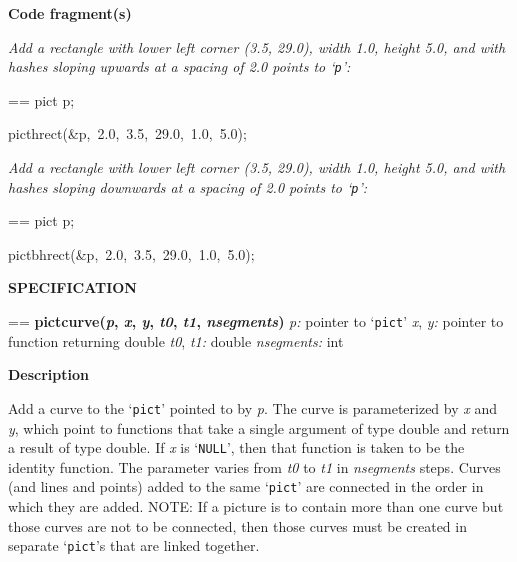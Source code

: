 \documentclass{book}
\makeatletter
\newcommand\Texinfocommandstyletextvar[1]{{\normalfont{}\textsl{#1}}}%
\newenvironment{Texinfopreformatted}{%
  \par\GNUTobeylines\obeyspaces\frenchspacing\parskip=\z@\parindent=\z@}{}
{\catcode`\^^M=13 \gdef\GNUTobeylines{\catcode`\^^M=13 \def^^M{\null\par}}}
\newenvironment{Texinfoindented}{\begin{list}{}{}\item\relax}{\end{list}}
\renewcommand{\_}{\Texinfounderscore\discretionary{}{}{}}
\makeatother
\begin{document}
\noindent{}\textbf{Code fragment(s)}

\emph{Add a rectangle with lower left corner (3.5, 29.0),
width 1.0, height 5.0, and with hashes sloping upwards at a
spacing of 2.0 points to `\texttt{p}':}
\begin{Texinfoindented}
\begin{Texinfopreformatted}%
\ttfamily pict p;

pict\_hrect(\&p,\ 2.0,\ 3.5,\ 29.0,\ 1.0,\ 5.0);
\end{Texinfopreformatted}
\end{Texinfoindented}

\emph{Add a rectangle with lower left corner (3.5, 29.0),
width 1.0, height 5.0, and with hashes sloping downwards at a
spacing of 2.0 points to `\texttt{p}':}
\begin{Texinfoindented}
\begin{Texinfopreformatted}%
\ttfamily pict p;

pict\_bhrect(\&p,\ 2.0,\ 3.5,\ 29.0,\ 1.0,\ 5.0);
\end{Texinfopreformatted}
\end{Texinfoindented}

\noindent{}\textbf{SPECIFICATION}
\begin{Texinfoindented}
\begin{Texinfopreformatted}%
\textbf{pict\_curve(\Texinfocommandstyletextvar{p}, \Texinfocommandstyletextvar{x}, \Texinfocommandstyletextvar{y}, \Texinfocommandstyletextvar{t0}, \Texinfocommandstyletextvar{t1}, \Texinfocommandstyletextvar{nsegments})}
\Texinfocommandstyletextvar{p:} pointer to `\texttt{pict}'
\Texinfocommandstyletextvar{x}, \Texinfocommandstyletextvar{y:} pointer to function returning double
\Texinfocommandstyletextvar{t0}, \Texinfocommandstyletextvar{t1:} double
\Texinfocommandstyletextvar{nsegments:} int
\end{Texinfopreformatted}
\end{Texinfoindented}
%
%

\noindent{}\textbf{Description}

Add a curve to the `\texttt{pict}' pointed to by \Texinfocommandstyletextvar{p}.
The curve is parameterized by \Texinfocommandstyletextvar{x} and \Texinfocommandstyletextvar{y},
which point to functions that take a single
argument of type double and return a result of type double.
If \Texinfocommandstyletextvar{x} is `\texttt{NULL}', then that function is taken to be the identity function.
The parameter varies from \Texinfocommandstyletextvar{t0} to \Texinfocommandstyletextvar{t1}
in \Texinfocommandstyletextvar{nsegments} steps.
Curves (and lines and points) added to the same `\texttt{pict}' are connected in
the order in which they are added.
NOTE: If a picture is to contain more than one curve but those
curves are not to be connected, then those curves must
be created in separate `\texttt{pict}'s that are linked together.
\end{document}
